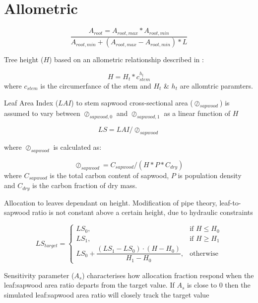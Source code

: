 \section{Allometric}
\label{Allometric}




\begin{equation}
	\frac{A_{root}=A_{root,max}*A_{root,min}}{A_{root,min}+(A_{root,max}-A_{root,min})*L}
\end{equation}

Tree height ($H$) based on an allometric relationship described in \citet{Causton1985}:

\begin{equation}
	H = H_{t} * c_{stem}^{h_{t}}
\end{equation}
where $c_{stem}$ is the circumerfance of the stem and $H_{t}$ \& $h_{t}$ are allomtric paramters.
                                
Leaf Area Index ($LAI$) to stem sapwood cross-sectional area ($\oslash_{sapwood}$) is assumed to vary between $\oslash_{sapwood,0}$ and $\oslash_{sapwood,1}$ as a linear function of $H$ 

\begin{equation}
	LS = LAI / \oslash_{sapwood}
\end{equation}

where $\oslash_{sapwood}$ is calculated as:

\begin{equation}
	\oslash_{sapwood} = C_{sapwood}/(H * P *C_{dry} )
\end{equation}
where $C_{sapwood}$ is the total carbon content of sapwood, $P$ is population density and $C_{dry}$ is the carbon fraction of dry mass.

Allocation to leaves dependant on height. Modification of pipe theory, leaf-to-sapwood ratio is not constant above a certain  height, due to hydraulic constraints \citep{Magnani2000,Deckmun2006}

\begin{equation}
	LS_{target}=
	\begin{cases}
		    LS_{0},& \text{if } H\le H_{0} \\ 
		    LS_{1},& \text{if } H\ge H_{1} \\
		    LS_{0} + \dfrac{(LS_{1}-LS_{0})\cdot (H-H_{0})}{H_{1}-H_{0}},& \text{otherwise}
		\end{cases}
\end{equation}

Sensitivity parameter ($A_{s}$) characterises how allocation fraction respond when the leaf:sapwood area ratio departs from the target value. If $A_{s}$ is close to 0 then the simulated leaf:sapwood area ratio will closely track the target value


